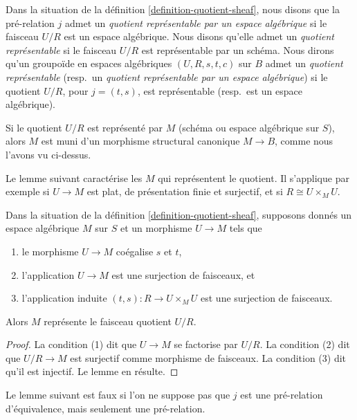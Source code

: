 \begin{definition}
\label{definition-representable-quotient}
Dans la situation de la définition \ref{definition-quotient-sheaf}, nous disons que la pré-relation $j$ admet un {\it quotient représentable par un espace algébrique} si le faisceau $U/R$ est un espace algébrique. Nous disons qu'elle admet un {\it quotient représentable} si le faisceau $U/R$ est représentable par un schéma. Nous dirons qu'un groupoïde en espaces algébriques $(U, R, s, t, c)$ sur $B$ admet un {\it quotient représentable} (resp.\ un {\it quotient représentable par un espace algébrique}) si le quotient $U/R$, pour $j = (t, s)$, est représentable (resp.\ est un espace algébrique).
\end{definition}

\noindent
Si le quotient $U/R$ est représenté par $M$ (schéma ou espace algébrique sur $S$), alors $M$ est muni d'un morphisme structural canonique $M \to B$, comme nous l'avons vu ci-dessus.

\medskip\noindent
Le lemme suivant caractérise les $M$ qui représentent le quotient. Il s'applique par exemple si $U \to M$ est plat, de présentation finie et surjectif, et si $R \cong U \times_M U$.

\begin{lemma}
\label{lemma-criterion-quotient-representable}
Dans la situation de la définition \ref{definition-quotient-sheaf}, supposons donnés un espace algébrique $M$ sur $S$ et un morphisme $U \to M$ tels que
\begin{enumerate}
\item le morphisme $U \to M$ coégalise $s$ et $t$,
\item l'application $U \to M$ est une surjection de faisceaux, et
\item l'application induite $(t, s) : R \to U \times_M U$ est une surjection de faisceaux.
\end{enumerate}
Alors $M$ représente le faisceau quotient $U/R$.
\end{lemma}

\begin{proof}
La condition (1) dit que $U \to M$ se factorise par $U/R$. La condition (2) dit que $U/R \to M$ est surjectif comme morphisme de faisceaux. La condition (3) dit qu'il est injectif. Le lemme en résulte.
\end{proof}

\noindent
Le lemme suivant est faux si l'on ne suppose pas que $j$ est une pré-relation d'équivalence, mais seulement une pré-relation.

